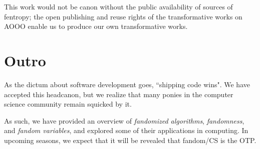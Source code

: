 \documentclass[9pt]{sigplanconf}
\begin{document}
This work would not be canon without the public availability of sources of
fentropy; the open publishing and reuse rights of the transformative works on
AOOO enable us to produce our own transformative works.

\section{Outro}
As the dictum about software development goes, ``shipping code wins". We have
accepted this headcanon, but we realize that many ponies in the computer
science community remain squicked by it.

As such, we have provided an overview of \emph{fandomized algorithms},
\emph{fandomness}, and \emph{fandom variables}, and explored some of their
applications in computing. In upcoming seasons, we expect that it will be
revealed that fandom/CS is the OTP.



\end{document}
